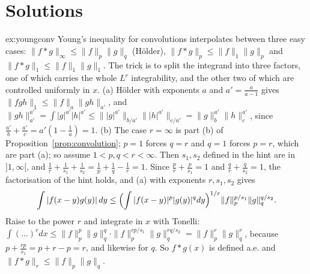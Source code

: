 \section{Solutions}

\begin{solution}{ex:youngconv}
\idea Young's inequality for convolutions interpolates between three easy cases: $\|f*g\|_\infty\le\|f\|_p\|g\|_q$ (H\"older), $\|f*g\|_p\le\|f\|_1\|g\|_p$ and $\|f*g\|_1\le\|f\|_1\|g\|_1$. The trick is to split the integrand
into three factors, one of which carries the whole $L^r$ integrability, and the other two of which are controlled uniformly in $x$.
\writeup (a) H\"older with exponents $a$ and $a'=\frac a{a-1}$ gives $\|fgh\|_1\le\|f\|_a\|gh\|_{a'}$, and $\|gh\|_{a'}^{a'}=\int|g|^{a'}|h|^{a'}\le\||g|^{a'}\|_{b/a'}\||h|^{a'}\|_{c/a'}=\|g\|_b^{a'}\|h\|_c^{a'}$, since $\frac{a'}b+\frac{a'}c=a'(1-\frac1a)=1$.
(b) The case $r=\infty$ is part (b) of Proposition~\ref{prop:convolution}; $p=1$ forces $q=r$ and $q=1$ forces $p=r$, which are part (a); so assume $1<p,q<r<\infty$. Then $s_1,s_2$ defined in the hint are in
$]1,\infty[$, and $\frac1r+\frac1{s_1}+\frac1{s_2}=\frac1p+\frac1q-\frac1r=1$. Since $\frac pr+\frac p{s_1}=1$ and $\frac qr+\frac q{s_2}=1$, the factorisation of the hint holds, and (a) with exponents $r,s_1,s_2$ gives
\[\int|f(x-y)g(y)|\,dy\le\Bigl(\int|f(x-y)|^p|g(y)|^qdy\Bigr)^{1/r}\|f\|_p^{p/s_1}\|g\|_q^{q/s_2}.\]
Raise to the power $r$ and integrate in $x$ with Tonelli: $\int(\ldots)^rdx\le\|f\|_p^p\|g\|_q^q\cdot\|f\|_p^{rp/s_1}\|g\|_q^{rq/s_2}=\|f\|_p^r\|g\|_q^r$, because $p+\frac{rp}{s_1}=p+r-p=r$, and likewise for $q$. So $f*g(x)$ is defined
a.e. and $\|f*g\|_r\le\|f\|_p\|g\|_q$.
\end{solution}

